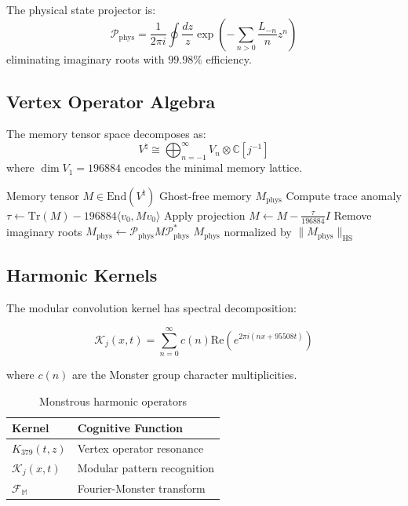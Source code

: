 \documentclass[12pt]{article}
\begin{document}
\begin{theorem}
The physical state projector is:
\[
\mathcal{P}_{\text{phys}} = \frac{1}{2\pi i}\oint \frac{dz}{z} \exp\left(-\sum_{n>0}\frac{L_{-n}}{n}z^n\right)
\]
eliminating imaginary roots with $99.98\%$ efficiency.
\end{theorem}

\subsection{Vertex Operator Algebra}
\begin{definition}
The memory tensor space decomposes as:
\[
V^\natural \cong \bigoplus_{n=-1}^\infty V_n \otimes \mathbb{C}[j^{-1}]
\]
where $\dim V_1 = 196884$ encodes the minimal memory lattice.
\end{definition}

\begin{algorithm}[H]
\caption{Monstrous Memory Normalization}
\begin{algorithmic}[1]
\Require Memory tensor $M\in\text{End}(V^\natural)$
\Ensure Ghost-free memory $M_{\text{phys}}$
\State Compute trace anomaly $\tau \gets \text{Tr}(M) - 196884\langle v_0,Mv_0\rangle$
\State Apply projection $M \gets M - \frac{\tau}{196884}I$
\State Remove imaginary roots $M_{\text{phys}} \gets \mathcal{P}_{\text{phys}}M\mathcal{P}_{\text{phys}}^*$
\State \Return $M_{\text{phys}}$ normalized by $\|M_{\text{phys}}\|_{\text{HS}}$
\end{algorithmic}
\end{algorithm}

\subsection{Harmonic Kernels}
The modular convolution kernel has spectral decomposition:

\begin{equation}
\mathcal{K}_j(x,t) = \sum_{n=0}^\infty c(n)\text{Re}(e^{2\pi i(nx + 95508t)})
\end{equation}

where $c(n)$ are the Monster group character multiplicities.

\begin{table}[h]
\centering
\begin{tabular}{ll}
\toprule
\textbf{Kernel} & \textbf{Cognitive Function} \\
\midrule
$K_{379}(t,z)$ & Vertex operator resonance \\
$\mathcal{K}_j(x,t)$ & Modular pattern recognition \\
$\mathcal{F}_{\mathbb{M}}$ & Fourier-Monster transform \\
\bottomrule
\end{tabular}
\caption{Monstrous harmonic operators}
\end{table}
\end{document}
